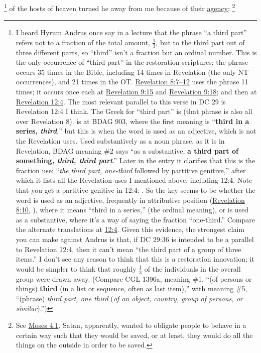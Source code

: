			\footnote{%
				I heard Hyrum Andrus once say in a lecture that the phrase ``a third part'' refers not to a fraction of the total amount, $\frac{1}{3}$, but to the third part out of three different parts, so ``third'' isn't a fraction but an ordinal number. This is the only occurrence of ``third part'' in the restoration scriptures; the phrase occurs 35 times in the Bible, including 14 times in Revelation (the only NT occurrences), and 21 times in the OT. \hyperref[REVELATIONNT-8-7]{Revelation 8:7--12} uses the phrase 11 times; it occurs once each at \hyperref[REVELATIONNT-9-15]{Revelation 9:15} and \hyperref[REVELATIONNT-9-18]{Revelation 9:18}; and then at \hyperref[REVELATIONNT-12-4]{Revelation 12:4}. The most relevant parallel to this verse in DC 29 is Revelation 12:4 I think. The Greek for ``third part'' is  (that phrase is also all over Revelation 8).  is at BDAG 903, where the first meaning is ``\textbf{third in a series, \textit{third}},'' but this is when the word is used as an adjective, which is not the Revelation uses. Used substantively as a noun phrase, as it is in Revelation, BDAG meaning \#2 says ``as a substantive, \textbf{a third part of something, \textit{third, third part}}.'' Later in the entry it clarifies that this is the fraction use: ``\textit{the third part, one-third} followed by partitive genitive,'' after which it lists all the Revelation uses I mentioned above, including 12:4. Note that you get a partitive genitive in 12:4: . So the key seems to be whether the word is used as an adjective, frequently in attributive position (\hyperref[REVELATIONNT-8-10]{Revelation 8:10}, ), where it means ``third in a series,'' (the ordinal meaning), or is used as a substantive, where it's a way of saying the fraction ``one-third.'' Compare the alternate translations at \hyperref[REVELATIONNT-12-4]{12:4}. Given this evidence, the strongest claim you can make against Andrus is that, if DC 29:36 is intended to be a parallel to Revelation 12:4, then it can't mean ``the third part of a group of three items.'' I don't see any reason to think that this is a restoration innovation; it would be simpler to think that roughly $\frac{1}{3}$ of the individuals in the overall group were drawn away. (Compare CGL 1396a, meaning \#1, ``(of persons or things) \textbf{third} (in a list or sequence, often as last item),'' with meaning \#5, ``(phrase)  \textit{third part, one third} (\textit{of an object, country, group of persons, or similar}).'') 
				}
		of the hosts of heaven turned he away from me because of their \hyperref[AGENCY]{agency};%
			\footnote{%
				See \hyperref[MOSES-4-1]{Moses 4:1}. Satan, apparently, wanted to obligate people to behave in a certain way such that they would be saved, or at least, they would do all the things on the outside in order to be saved.
				}

